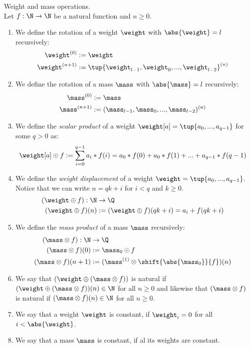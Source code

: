 \begin{definition}{Weight and mass operations.}\label{product_displacement_definition}\\
	Let $f: \N \to \N$ be a natural function and $n\geq0$.
	\begin{enumerate}
		\item We define the rotation of a weight $\weight$ with $\abs{\weight} = l$ recursively:
		\begin{align*}
			\weight^{(0)} &:= \weight \\
			\weight^{(n+1)} &:= \tup{\weight_{l-1},\weight_{0},...,\weight_{l-2}}^{(n)}
		\end{align*}
		\item We define the rotation of a mass $\mass$ with $\abs{\mass}=l$ recursively:
		\begin{align*}
			\mass^{(0)} &:= \mass \\
			\mass^{(n+1)} &:= (\mass_{l-1},\mass_{0},...,\mass_{l-2})^{(n)}
		\end{align*}
		\item We define the \textit{scalar product} of a weight $\weight[a] = \tup{a_0,...,a_{q-1}}$ for some $q>0$ as:
		$$\weight[a]\odot f := \sum_{i=0}^{q-1} a_i*f(i)= a_0 * f(0) + a_0*f(1) + ... + a_{q-1}*f(q-1)$$
		\item We define the \textit{weight displacement} of a weight $\weight = \tup{a_0,...,a_{q-1}}$. Notice that we can write $n = qk + i$ for $i<q$ and $k\geq0$.
		\begin{align*}
			(\weight \oplus f): \N &\to \Q \\
			(\weight \oplus f)(n) &:= (\weight \oplus f)(qk + i) = a_i + f(qk + i)
		\end{align*}
		\item We define the \textit{mass product} of a mass $\mass$ recursively:
		\begin{align*}
			(\mass\otimes f): \N &\to \Q \\
			(\mass\otimes f)(0) &:= \mass_0 \odot f \\
			(\mass\otimes f)(n+1) &:= (\mass^{(1)} \otimes \shift{\abs{\mass_0}}{f})(n)
		\end{align*}
		\item We say that $(\weight \oplus (\mass \otimes f))$ is natural if $(\weight \oplus (\mass \otimes f))(n) \in \N$ for all $n \geq 0$ and likewise that $(\mass \otimes f)$ is natural if $(\mass \otimes f)(n) \in \N$ for all $n \geq 0$.
		\item We say that a weight $\weight$ is constant, if $\weight_i = 0$ for all $i<\abs{\weight}$.
		\item We say that a mass $\mass$ is constant, if al its weights are constant.
	\end{enumerate}
\end{definition}


